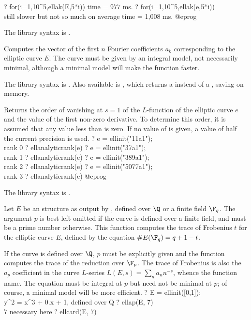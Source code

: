 ? for(i=1,10^5,ellak(E,5*i))
time = 977 ms.
? for(i=1,10^5,ellak(e,5*i)) \\ still slower but not so much on average
time = 1,008 ms.
@eprog

The library syntax is .

\label{se:ellan}
Computes the vector of the first $n$ Fourier coefficients $a_k$
corresponding to the elliptic curve $E$. The curve must be given by an
integral model, not necessarily minimal, although a minimal model will make
the function faster.

The library syntax is .
Also available is , which
returns a  instead of a , saving on memory.

\label{se:ellanalyticrank}
Returns the order of vanishing at $s=1$ of the $L$-function of the
elliptic curve $e$ and the value of the first non-zero derivative. To
determine this order, it is assumed that any value less than  is
zero. If no value of  is given, a value of half the current
precision is used.
\bprog
? e = ellinit("11a1"); \\ rank 0
? ellanalyticrank(e)
? e = ellinit("37a1"); \\ rank 1
? ellanalyticrank(e)
? e = ellinit("389a1"); \\ rank 2
? ellanalyticrank(e)
? e = ellinit("5077a1"); \\ rank 3
? ellanalyticrank(e)
@eprog

The library syntax is .

\label{se:ellap}
Let $E$ be an  structure as output by , defined over
$\Q$ or a finite field $\F_q$. The argument $p$ is best left omitted if the
curve is defined over a finite field, and must be a prime number otherwise.
This function computes the trace of Frobenius $t$ for the elliptic curve $E$,
defined by the equation $\#E(\F_q) = q+1 - t$.

If the curve is defined over $\Q$, $p$ must be explicitly given and the
function computes the trace of the reduction over $\F_p$.
The trace of Frobenius is also the $a_p$ coefficient in the curve $L$-series
$L(E,s) = \sum_n a_n n^{-s}$, whence the function name. The equation must be
integral at $p$ but need not be minimal at $p$; of course, a minimal model
will be more efficient.
\bprog
? E = ellinit([0,1]);  \\ y^2 = x^3 + 0.x + 1, defined over Q
? ellap(E, 7) \\ 7 necessary here
? ellcard(E, 7)

